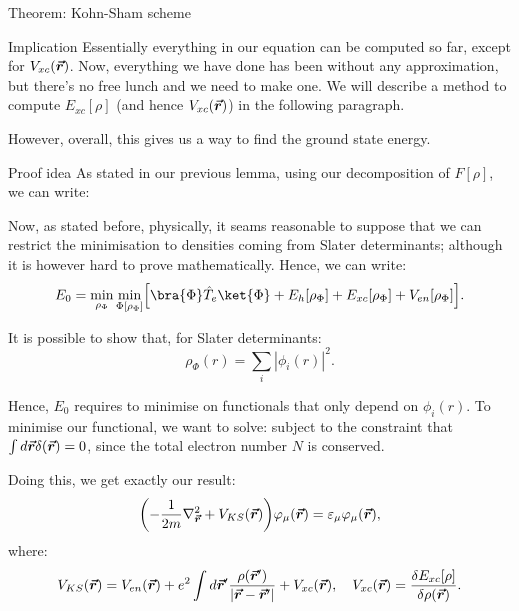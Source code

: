 \documentclass[a4paper]{article}
\begin{document}
\begin{parag}{Theorem: Kohn-Sham scheme}
    \begin{subparag}{Implication}
        Essentially everything in our equation can be computed so far, except for $V_{xc}\left(\bvec{r}\right)$. Now, everything we have done has been without any approximation, but there's no free lunch and we need to make one. We will describe a method to compute $E_{xc}\left[\rho\right]$ (and hence $V_{xc}\left(\bvec{r}\right)$) in the following paragraph.

        However, overall, this gives us a way to find the ground state energy.
    \end{subparag}
    
    \begin{subparag}{Proof idea}
        As stated in our previous lemma, using our decomposition of $F\left[\rho\right]$, we can write:

        Now, as stated before, physically, it seams reasonable to suppose that we can restrict the minimisation to densities coming from Slater determinants; although it is however hard to prove mathematically. Hence, we can write:
        \[E_0 = \min_{\rho_{\Phi}} \min_{\Phi\left[\rho_{\Phi}\right]} \left[\bra{\Phi} \hat{T}_e \ket{\Phi} + E_h\left[\rho_{\Phi}\right] + E_{xc}\left[\rho_{\Phi}\right]+ V_{en}\left[\rho_{\Phi}\right]\right].\]

        It is possible to show that, for Slater determinants:
        \[\rho_{\Phi}\left(r\right) = \sum_{i} \left|\phi_i\left(r\right)\right|^2.\]

        Hence, $E_0$ requires to minimise on functionals that only depend on $\phi_i\left(r\right)$. To minimise our functional, we want to solve: 
        subject to the constraint that $\int d \bvec{r} \delta\left(\bvec{r}\right) = 0$, since the total electron number $N$ is conserved.
        
        Doing this, we get exactly our result:
        \[\left(-\frac{1}{2m} \nabla^2_{\bvec{r}} + V_{KS}\left(\bvec{r}\right)\right) \phi_{\mu}\left(\bvec{r}\right) = \epsilon_{\mu} \phi_{\mu}\left(\bvec{r}\right),\]
        where:
        \[V_{KS}\left(\bvec{r}\right) = V_{en}\left(\bvec{r}\right) + e^2 \int d \bvec{r}' \frac{\rho\left(\bvec{r}'\right)}{\left|\bvec{r} - \bvec{r}'\right|} + V_{xc}\left(\bvec{r}\right), \mathspace V_{xc}\left(\bvec{r}\right) = \frac{\delta E_{xc}\left[\rho\right]}{\delta \rho\left(\bvec{r}\right)}.\]
    \end{subparag}
\end{parag}
\end{document}
